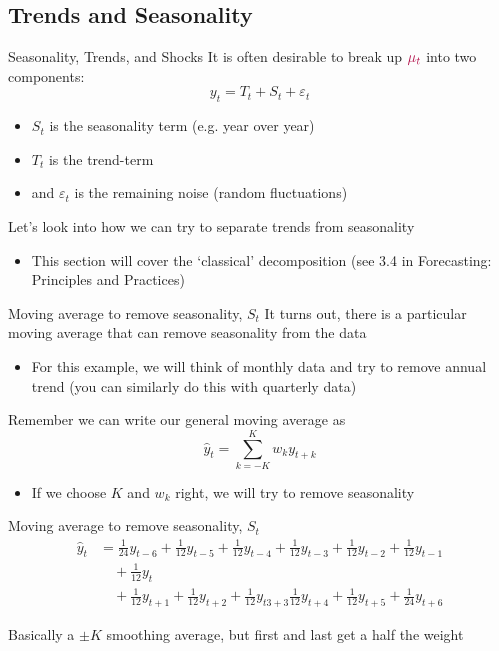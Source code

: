 \documentclass[aspectratio=169,t,11pt,table]{beamer}
\begin{document}
\subsection{Trends and Seasonality}

\begin{frame}{Seasonality, Trends, and Shocks}
  It is often desirable to break up ${\color[HTML]{B3114B} \mu_t}$ into two components:
  $$
    y_t = T_t + S_t +  \varepsilon_t
  $$
  \begin{itemize}
    \item $S_t$ is the seasonality term (e.g. year over year)
    
    \item $T_t$ is the trend-term
    
    \item and $\varepsilon_t$ is the remaining noise (random fluctuations)
  \end{itemize}

  \bigskip
  Let's look into how we can try to separate trends from seasonality
  \begin{itemize}
    \item This section will cover the `classical' decomposition (see 3.4 in Forecasting: Principles and Practices)
  \end{itemize}
\end{frame}


\begin{frame}{Moving average to remove seasonality, $S_t$}
  It turns out, there is a particular moving average that can remove seasonality from the data
  \begin{itemize}
    \item For this example, we will think of monthly data and try to remove annual trend (you can similarly do this with quarterly data)
  \end{itemize}

  \bigskip
  Remember we can write our general moving average as
  $$
    \hat{y}_t = \sum_{k=-K}^K w_k y_{t + k}
  $$
  \begin{itemize}
    \item If we choose $K$ and $w_k$ right, we will try to remove seasonality
  \end{itemize}
\end{frame}

\begin{frame}{Moving average to remove seasonality, $S_t$}
  \begin{align*}
    \hat{y}_t &= \frac{1}{24} y_{t-6} + \frac{1}{12} y_{t-5} + \frac{1}{12} y_{t-4} + \frac{1}{12} y_{t-3} + \frac{1}{12} y_{t-2} + \frac{1}{12} y_{t-1} \\
    &\quad + \frac{1}{12} y_{t} \\
    &\quad + \frac{1}{12} y_{t+1} + \frac{1}{12} y_{t+2} + \frac{1}{12} y_{t3+3} \frac{1}{12} y_{t+4} + \frac{1}{12} y_{t+5} + \frac{1}{24} y_{t+6} 
  \end{align*}

  Basically a $\pm K$ smoothing average, but first and last get a half the weight
\end{frame}
\end{document}
